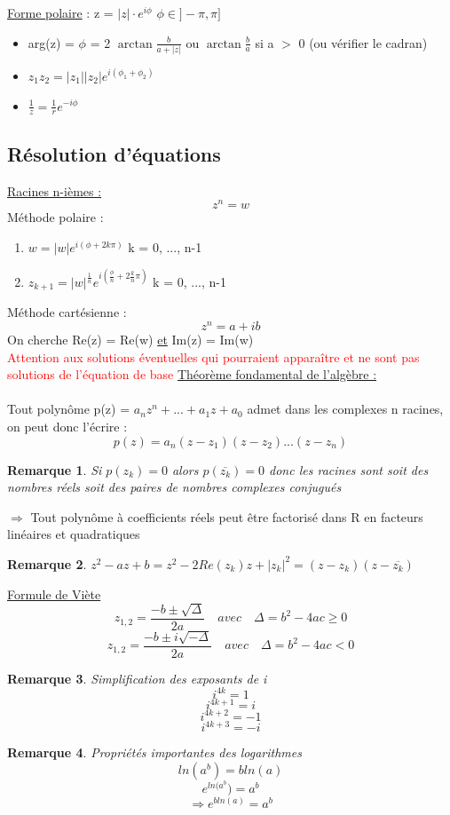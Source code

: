 \documentclass{article}
\newtheorem{remark}{Remarque}[section]
\begin{document}
\underline{Forme polaire} : z = \( |z|\cdot e^{i\phi} \) \qquad \qquad \qquad \( \phi \in ]-\pi, \pi]\)
\begin{itemize}
    \item arg(z) = \(\phi\) = 2 \( \arctan{\frac{b}{a + |z|}} \) ou \( \arctan{\frac{b}{a}}\) si a $>$ 0 (ou vérifier le cadran)
    \item \( z_1z_2 = |z_1||z_2|e^{i(\phi_1 + \phi_2)} \)
    \item \( \frac{1}{z} = \frac{1}{r}e^{-i\phi} \)
\end{itemize}
\subsection{Résolution d'équations}
\underline{Racines n-ièmes :}
\[ z^n = w\]
Méthode polaire :
\begin{enumerate}
    \item \( w = |w|e^{i(\phi + 2k\pi)} \) \qquad \qquad \qquad k = 0, ..., n-1
    \item \( z_{k+1} = |w|^{\frac{1}{n}}e^{i(\frac{\phi}{n} + 2\frac{k}{n}\pi)} \) \qquad \qquad \qquad k = 0, ..., n-1
\end{enumerate}
Méthode cartésienne :
\[ z^n = a + ib \]
On cherche Re(z) = Re(w) \underline{et} Im(z) = Im(w) \\
\textcolor{red}{Attention aux solutions éventuelles qui pourraient apparaître et ne sont pas solutions de l'équation de base}
\newpage
\underline{Théorème fondamental de l'algèbre :} \\\\
Tout polynôme p(z) = \( a_nz^n+...+a_1z +a_0 \) admet dans les complexes n racines, on peut donc l'écrire :
\[ p(z) = a_n(z - z_1)(z - z_2)...(z - z_n)\]
\begin{remark}
    Si \(p(z_k) = 0\) alors \(p(\overline{z_k}) = 0\) donc les racines sont soit des nombres réels soit des paires de nombres complexes conjugués
\end{remark}
\(\Rightarrow\) Tout polynôme à coefficients réels peut être factorisé dans R en facteurs linéaires et quadratiques
\begin{remark}
    \( z^2 - az + b = z^2 - 2Re(z_k)z + |z_k|^2 = (z - z_k)(z - \overline{z_k})\)
\end{remark}
\underline{Formule de Viète}
\[ z_{1,2} = \frac{-b \pm \sqrt{\Delta}}{2a} \quad avec \quad \Delta = b^2 - 4ac \geq 0\]
\[ z_{1,2} = \frac{-b \pm i\sqrt{-\Delta}}{2a} \quad avec \quad \Delta = b^2 - 4ac < 0\]

\begin{remark}
Simplification des exposants de i
    \[ i^{4k} = 1 \]
    \[ i^{4k+1} = i \]
    \[ i^{4k+2} = -1 \] 
    \[ i^{4k+3} = -i \]
\end{remark}
\begin{remark}
Propriétés importantes des logarithmes
    \[ ln(a^{b}) = bln(a) \]
    \[ e^{ln(a^{b}}) = a^{b} \]
    \[ \Rightarrow e^{bln(a)} = a^{b} \]
\end{remark}
\end{document}
